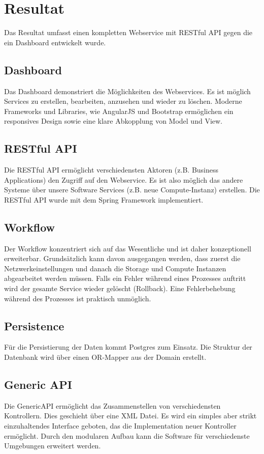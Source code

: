 \chapter{Resultat}
Das Resultat umfasst einen kompletten Webservice mit RESTful API gegen die ein Dashboard entwickelt wurde.

\section{Dashboard}
Das Dashboard demonstriert die Möglichkeiten des Webservices. Es ist möglich Services zu erstellen, bearbeiten, anzusehen und wieder zu löschen. Moderne Frameworks und Libraries, wie AngularJS und Bootstrap ermöglichen ein responsives Design sowie eine klare Abkopplung von Model und View.

\section{RESTful API}
Die RESTful API ermöglicht verschiedensten Aktoren (z.B. Business Applications) den Zugriff auf den Webservice. Es ist also möglich das andere Systeme über unsere Software Services (z.B. neue Compute-Instanz) erstellen. Die RESTful API wurde mit dem Spring Framework implementiert. 

\section{Workflow}
Der Workflow konzentriert sich auf das Wesentliche und ist daher konzeptionell erweiterbar. Grundsätzlich kann davon ausgegangen werden, dass zuerst die Netzwerkeinstellungen und danach die Storage und Compute Instanzen abgearbeitet werden müssen. Falls ein Fehler während eines Prozesses auftritt wird der gesamte Service wieder gelöscht (Rollback). Eine Fehlerbehebung während des Prozesses ist praktisch unmöglich.

\section{Persistence}
Für die Persistierung der Daten kommt Postgres zum Einsatz. Die Struktur der Datenbank wird über einen OR-Mapper aus der Domain erstellt. 

\section{Generic API}
Die GenericAPI ermöglicht das Zusammenstellen von verschiedensten Kontrollern. Dies geschieht über eine XML Datei. Es wird ein simples aber strikt einzuhaltendes Interface geboten, das die Implementation neuer Kontroller ermöglicht. Durch den modularen Aufbau kann die Software für verschiedenste Umgebungen erweitert werden.